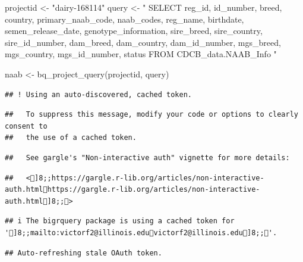 \documentclass[
]{article}
\newenvironment{Shaded}{\begin{snugshade}}{\end{snugshade}}
\newcommand{\FunctionTok}[1]{\textcolor[rgb]{0.00,0.00,0.00}{#1}}
\newcommand{\NormalTok}[1]{#1}
\newcommand{\OtherTok}[1]{\textcolor[rgb]{0.56,0.35,0.01}{#1}}
\newcommand{\StringTok}[1]{\textcolor[rgb]{0.31,0.60,0.02}{#1}}
\begin{document}
\begin{Shaded}
\begin{Highlighting}[]
\NormalTok{projectid }\OtherTok{\textless{}{-}} \StringTok{"dairy{-}168114"}
\NormalTok{query }\OtherTok{\textless{}{-}} \StringTok{"}
\StringTok{SELECT}
\StringTok{    reg\_id,}
\StringTok{    id\_number,}
\StringTok{    breed,}
\StringTok{    country,}
\StringTok{    primary\_naab\_code,}
\StringTok{    naab\_codes,}
\StringTok{    reg\_name,}
\StringTok{    birthdate,}
\StringTok{    semen\_release\_date,}
\StringTok{    genotype\_information,}
\StringTok{    sire\_breed,}
\StringTok{    sire\_country,}
\StringTok{    sire\_id\_number,}
\StringTok{    dam\_breed,}
\StringTok{    dam\_country,}
\StringTok{    dam\_id\_number,}
\StringTok{    mgs\_breed,}
\StringTok{    mgs\_country,}
\StringTok{    mgs\_id\_number,}
\StringTok{    status}
\StringTok{FROM}
\StringTok{    CDCB\_data.NAAB\_Info}
\StringTok{"}

\NormalTok{naab }\OtherTok{\textless{}{-}} \FunctionTok{bq\_project\_query}\NormalTok{(projectid, query)}
\end{Highlighting}
\end{Shaded}

\begin{verbatim}
## ! Using an auto-discovered, cached token.
\end{verbatim}

\begin{verbatim}
##   To suppress this message, modify your code or options to clearly consent to
##   the use of a cached token.
\end{verbatim}

\begin{verbatim}
##   See gargle's "Non-interactive auth" vignette for more details:
\end{verbatim}

\begin{verbatim}
##   <]8;;https://gargle.r-lib.org/articles/non-interactive-auth.htmlhttps://gargle.r-lib.org/articles/non-interactive-auth.html]8;;>
\end{verbatim}

\begin{verbatim}
## i The bigrquery package is using a cached token for ']8;;mailto:victorf2@illinois.eduvictorf2@illinois.edu]8;;'.
\end{verbatim}

\begin{verbatim}
## Auto-refreshing stale OAuth token.
\end{verbatim}
\end{document}
